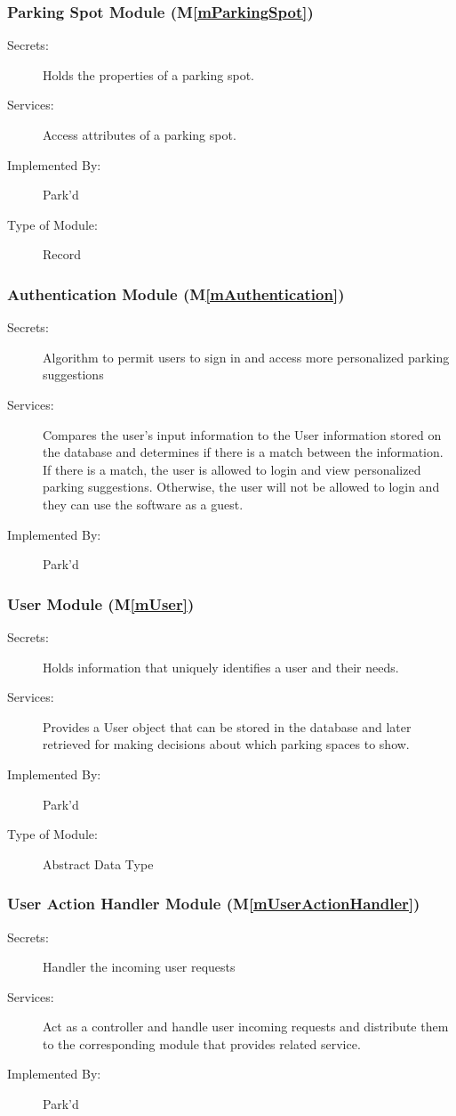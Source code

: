 \documentclass[12pt, titlepage]{article}
\newcommand{\mref}[1]{M\ref{#1}}
\begin{document}
\subsubsection{Parking Spot Module (\mref{mParkingSpot})}
\begin{description}
\item[Secrets:] Holds the properties of a parking spot.
\item[Services:] Access attributes of a parking spot.
\item[Implemented By:] Park'd
\item[Type of Module:] Record
\end{description}

\subsubsection{Authentication Module (\mref{mAuthentication})}
\begin{description}
\item[Secrets:] Algorithm to permit users to sign in and access more
personalized parking suggestions  
\item[Services:] Compares the user's input information to the User information
stored on the database and determines if there is a match between the
information. If there is a match, the user is allowed to login and view
personalized parking suggestions. Otherwise, the user will not be allowed to
login and they can use the software as a guest.
\item[Implemented By:] Park'd
\end{description}

\subsubsection{User Module (\mref{mUser})}
\begin{description}
\item[Secrets:] Holds information that uniquely identifies a user and their
needs.
\item[Services:] Provides a User object that can be stored in the database and
later retrieved for making decisions about which parking spaces to show.
\item[Implemented By:] Park'd
\item[Type of Module:] Abstract Data Type
\end{description}

\subsubsection{User Action Handler Module (\mref{mUserActionHandler})}
\begin{description}
\item[Secrets:] Handler the incoming user requests
\item[Services:] Act as a controller and handle user incoming requests and
distribute them to the corresponding module that provides related service.
\item[Implemented By:] Park'd
\end{description}
\end{document}
